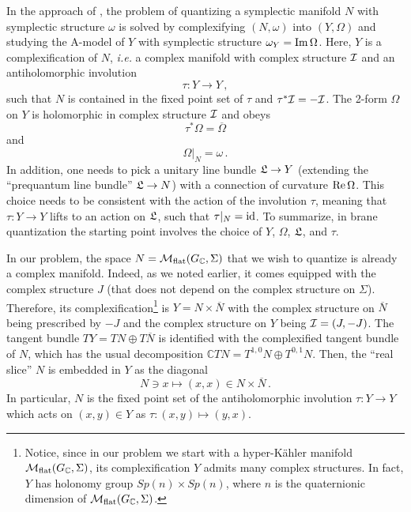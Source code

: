 \documentclass[hyper]{JHEP3}
\renewcommand{\Im}{{\rm Im}\,}
\renewcommand{\Re}{{\rm Re}\,}
\def\CI {{\cal I}}
\newcommand{\C}{{\mathbb{C}}}
\newcommand{\M}{{{\cal M}}_{{\rm flat}}}
\newcommand\be{\begin{equation}}
\newcommand\ee{\end{equation}}
\begin{document}
In the approach of \cite{gukov-2008}, the problem of quantizing
a symplectic manifold $N$ with symplectic structure $\omega$
is solved by complexifying $(N,\omega)$ into $(Y,\Omega)$
and studying the A-model of $Y$ with symplectic structure $\omega_Y = \Im \Omega$.
Here, $Y$ is a complexification of $N$, {\it i.e.} a complex manifold
with complex structure $\CI$ and an antiholomorphic involution
\be
\tau: Y \to Y \,,
\ee
such that $N$ is contained in the fixed point set of $\tau$ and $\tau^* \CI = - \CI$.
The 2-form $\Omega$ on $Y$ is holomorphic in complex structure $\CI$ and obeys
\be
\tau^* \Omega = \overline{\Omega}
\label{omtau}
\ee
and
\be
\Omega \vert_N = \omega\,.
\label{omrestr}
\ee
In addition, one needs to pick a unitary line bundle $\frak L \to Y$
(extending the ``prequantum line bundle'' $\frak L \to N$)
with a connection of curvature $\Re \Omega$.
This choice needs to be consistent with the action of the involution $\tau$,
meaning that $\tau: Y \to Y$ lifts to an action on $\frak L$,
such that $\tau|_N = {\rm id}$.
To summarize, in brane quantization the starting point involves the choice
of $Y$, $\Omega$, $\frak L$, and $\tau$.

In our problem, the space $N = \M (G_{\C},\Sigma)$ that we wish to quantize
is already a complex manifold. Indeed, as we noted earlier, it comes equipped
with the complex structure $J$ (that does not depend on the complex structure on $\Sigma$).
Therefore, its complexification\footnote{Notice,
since in our problem we start with a hyper-K\"ahler
manifold $\M (G_{\C},\Sigma)$, its complexification $Y$
admits many complex structures.
In fact, $Y$ has holonomy group $Sp(n) \times Sp(n)$,
where $n$ is the quaternionic dimension of $\M (G_{\C},\Sigma)$.}
is $Y = N \times \overline{N}$
with the complex structure on $\overline{N}$ being prescribed by $-J$
and the complex structure on $Y$ being $\CI=(J, -J)$.
The tangent bundle $TY=TN\oplus T\overline{N}$
is identified with the complexified tangent bundle of $N$,
which has the usual decomposition $\C TN=T^{1,0}N\oplus T^{0,1} N$.
%
Then, the ``real slice'' $N$ is embedded in $Y$ as the diagonal
\be
N \ni x \mapsto (x, x) \in N \times \overline{N}\,.
\label{ndiag}
\ee
In particular, $N$ is the fixed point set of the antiholomorphic involution
$\tau : Y \to Y$ which acts on $(x,y) \in Y$ as $\tau: (x,y) \mapsto (y, x)$.
\end{document}
